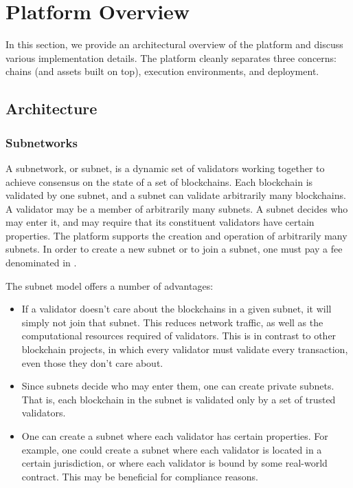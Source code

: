\documentclass[runningheads]{llncs}
\begin{document}
\section{Platform Overview}
\label{section:platform_overview}
In this section, we provide an architectural overview of the platform and discuss various implementation details. The \AVAPlatformName{} platform cleanly separates three concerns: chains (and assets built on top), execution environments, and deployment.

\subsection{Architecture}

\subsubsection{Subnetworks} 
A subnetwork, or subnet, is a dynamic set of validators working together to achieve consensus on the state of a set of blockchains.
Each blockchain is validated by one subnet, and a subnet can validate arbitrarily many blockchains.
A validator may be a member of arbitrarily many subnets.
A subnet decides who may enter it, and may require that its constituent validators have certain properties.
The \AVAPlatformName{} platform supports the creation and operation of arbitrarily many subnets.
In order to create a new subnet or to join a subnet, one must pay a fee denominated in \AVATokenName{}.

The subnet model offers a number of advantages:
\begin{itemize}
\item{} If a validator doesn't care about the blockchains in a given subnet, it will simply not join that subnet.
This reduces network traffic, as well as the computational resources required of validators.
This is in contrast to other blockchain projects, in which every validator must validate every transaction, even those they don't care about. 
\item{} Since subnets decide who may enter them, one can create private subnets.
That is, each blockchain in the subnet is validated only by a set of trusted validators.
\item{} One can create a subnet where each validator has certain properties.
For example, one could create a subnet where each validator is located in a certain jurisdiction, or where each validator
is bound by some real-world contract. This may be beneficial for compliance reasons.
\end{itemize}
\end{document}
